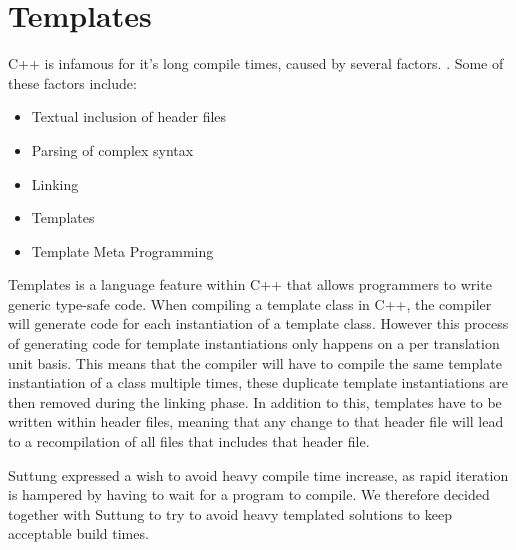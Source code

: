 \section{Templates}
\label{sec:requirements_templates}
C++ is infamous for it's long compile times, caused by several factors.
\cite{stack_overflow_why_does_cpp_compilation_take_so_long}.
Some of these factors include:
\begin{itemize}
    \item
    Textual inclusion of header files

    \item
    Parsing of complex syntax

    \item
    Linking

    \item
    Templates

    \item
    Template Meta Programming
\end{itemize}

Templates is a language feature within C++ that allows programmers to write generic type-safe code.
When compiling a template class in C++, the compiler will generate code for each instantiation of
a template class.
However this process of generating code for template instantiations only happens on a per translation unit basis.
This means that the compiler will have to compile the same template instantiation of a class multiple times,
these duplicate template instantiations are then removed during the linking phase.
In addition to this, templates have to be written within header files,
meaning that any change to that header file will lead to a recompilation of all files that includes that header file\cite{dr_dobbs_cpp_compilation_speed}.

Suttung expressed a wish to avoid heavy compile time increase, as rapid iteration is hampered by having to wait for a program to compile.
We therefore decided together with Suttung to try to avoid heavy templated solutions to keep acceptable build times.


